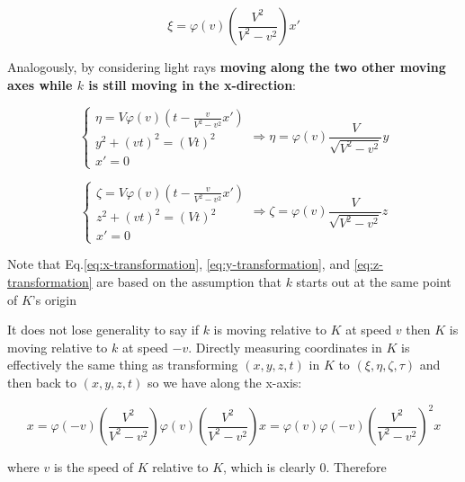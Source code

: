 \begin{equation}\label{eq:x-transformation}
    \xi = \varphi(v)\left( \frac{V^2}{V^2 - v^2} \right) x'
\end{equation}

Analogously, by considering light rays \textbf{moving along the two other moving axes while $k$ is still moving in the
x-direction}:

\begin{equation}\label{eq:y-transformation}
    \left\{
    \begin{array}{l}
        \eta = V\varphi(v)\left( t - \frac{v}{V^2 - v^2} x' \right) \\
        y^2 + (vt)^2 = (Vt)^2 \\
        x' = 0
    \end{array}
    \right.
    \Rightarrow
    \eta = \varphi(v)\frac{V}{\sqrt{V^2 - v^2}}y
\end{equation}

\begin{equation}\label{eq:z-transformation}
    \left\{
    \begin{array}{l}
        \zeta = V\varphi(v)\left( t - \frac{v}{V^2 - v^2} x' \right) \\
        z^2 + (vt)^2 = (Vt)^2 \\
        x' = 0
    \end{array}
    \right.
    \Rightarrow
    \zeta = \varphi(v)\frac{V}{\sqrt{V^2 - v^2}}z
\end{equation}

Note that Eq.\ref{eq:x-transformation}, \ref{eq:y-transformation}, and \ref{eq:z-transformation} are based on the
assumption that $k$ starts out at the same point of $K$'s origin

It does not lose generality to say if $k$ is moving relative to $K$ at speed $v$ then $K$ is moving relative to $k$ at
speed $-v$. Directly measuring coordinates in $K$ is effectively the same thing as transforming $(x, y, z, t)$ in $K$
to $(\xi, \eta, \zeta, \tau)$ and then back to $(x, y, z, t)$ so we have along the x-axis:

\begin{equation}
    x = \varphi(-v)\left( \frac{V^2}{V^2 - v^2} \right) \varphi(v)\left( \frac{V^2}{V^2 - v^2} \right) x = \varphi(v)\varphi(-v)\left( \frac{V^2}{V^2 - v^2} \right)^2 x
\end{equation}

where $v$ is the speed of $K$ relative to $K$, which is clearly 0. Therefore

